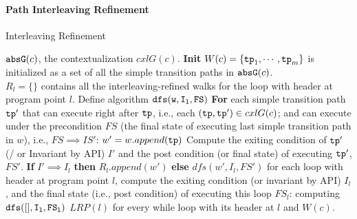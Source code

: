 \paragraph{Path Interleaving Refinement}
\begin{algorithm}
  \caption{
  {Interleaving Refinement}
  \label{alg:path-refine}
  }
  \begin{algorithmic}[1]
  \REQUIRE $\mathtt{abs}{\mathtt{G}}(c)$, the contextualization $cxlG(c)$.
  \STATE  \textbf{Init} $W(c) = \{\mathtt{tp}_1, \cdots, \mathtt{tp}_m\}$ is initialized as a set of all the simple transition paths in $\mathtt{abs}{\mathtt{G}}(c)$.
  \\
  $R_l = \{\}$ contains all the interleaving-refined walks for the loop with header at program point $l$.
  \STATE Define algorithm $\mathtt{dfs(w, I_{l}, FS)}$
  \STATE \quad \textbf{For} each simple transition path $\mathtt{tp}'$ that can execute right after $\mathtt{tp}$, 
  i.e., each $(\mathtt{tp}, \mathtt{tp}') \in cxlG(c)$;
  and can execute under the precondition $FS$ (the final state of executing last simple transition path in $w$), 
  i.e., $FS \implies IS'$:
  \STATE \quad \quad $w' = w.append(\mathtt{tp})$
  \STATE  \quad \quad Compute the exiting condition of $\mathtt{tp}'$ (/ or Invariant by  API) $I'$ and the 
  post condition (or final state) of executing $\mathtt{tp}'$, $FS'$.
  \STATE \quad \quad \textbf{If} $I' \implies I_l$
  \STATE \quad \quad \textbf{then} $R_l.append(w')$
  \STATE \quad \quad \textbf{else} $dfs(w', I_l, FS')$
    \STATE for each loop with header at program point $l$, 
    \STATE \quad compute the exiting condition (or invariant by API) $I_l$,
    and the final state (i.e., post condition) of executing this loop $FS_l$:
    \STATE \quad computing $\mathtt{dfs([], I_l,FS_l )}$
  \RETURN $LRP(l)$ for every while loop with its header at $l$ and $W(c)$.
  \end{algorithmic}
  \end{algorithm}

